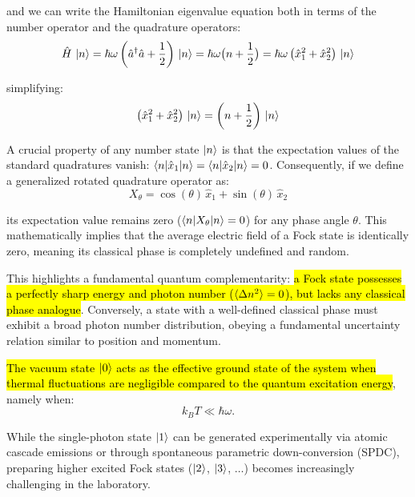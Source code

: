 and we can write the Hamiltonian eigenvalue equation both in terms of the number operator and the quadrature operators:
\begin{equation}\label{eqn:13-hamiltonian-eigenvalue-equation}
\hat{H}\, \ket{n} = \hbar \omega \left(\hat{a}^\dagger \hat{a}+\frac{1}{2} \right)\, \ket{n} =\hbar \omega \bigl(n+\frac{1}{2}\bigr) = \hbar \omega \left(\hat{x}_1^2+\hat{x}_2^2\right)\, \ket{n}
\end{equation}

simplifying:
\begin{equation}
\left(\hat{x}_1^2+\hat{x}_2^2\right)\, \ket{n} = \left(n+\frac{1}{2}\right) \, \ket{n}
\end{equation}
\vspace{1ex}

A crucial property of any number state $\ket{n}$ is that the expectation values of the standard quadratures vanish: $\braket{n|\hat{x}_1|n} = \braket{n|\hat{x}_2|n} = 0$. Consequently, if we define a generalized rotated quadrature operator as:
\begin{equation}\label{eqn:13-rotated-quadrature-operator}
X_\theta = \cos(\theta)\, \hat{x}_1+\sin(\theta) \, \hat{x}_2
\end{equation}

its expectation value remains zero ($\braket{n|X_\theta|n} = 0$) for any phase angle $\theta$. This mathematically implies that the average electric field of a Fock state is identically zero, meaning its classical phase is completely undefined and random.

This highlights a fundamental quantum complementarity: \hl{a Fock state possesses a perfectly sharp energy and photon number ($\braket{\Delta n^2} = 0$), but lacks any classical phase analogue}. Conversely, a state with a well-defined classical phase must exhibit a broad photon number distribution, obeying a fundamental uncertainty relation similar to position and momentum.

\hl{The vacuum state $\ket{0}$ acts as the effective ground state of the system when thermal fluctuations are negligible compared to the quantum excitation energy}, namely when:
\begin{equation}\label{eqn:13-vacuum-thermal-condition}
k_B T \ll \hbar \omega.
\end{equation}

While the single-photon state $\ket{1}$ can be generated experimentally via atomic cascade emissions or through spontaneous parametric down-conversion (SPDC), preparing higher excited Fock states ($\ket{2}$, $\ket{3}$, $\dots$) becomes increasingly challenging in the laboratory. 

